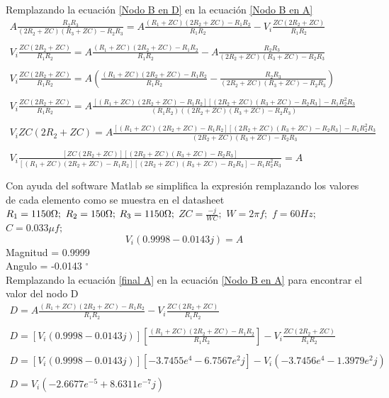     Remplazando la ecuación \ref{Nodo B en D} en la ecuación \ref{Nodo B en A}
    \begin{align*}
        A\frac{R_{2}R_{3}}{(2R_{2}+ZC)(R_{3}+ZC)-R_{2}R_{3}} = A\frac{(R_{1}+ZC)(2R_{2}+ZC) - R_{1}R_{2}}{R_{1}R_{2}} - V_{i}\frac{ZC(2R_{2}+ZC)}{R_{1}R_{2}}\\\\ 
        V_{i}\frac{ZC(2R_{2}+ZC)}{R_{1}R_{2}} = A\frac{(R_{1}+ZC)(2R_{2}+ZC) - R_{1}R_{2}}{R_{1}R_{2}} - A\frac{R_{2}R_{3}}{(2R_{2}+ZC)(R_{3}+ZC)-R_{2}R_{3}} \\\\ 
        V_{i}\frac{ZC(2R_{2}+ZC)}{R_{1}R_{2}} = A(\frac{(R_{1}+ZC)(2R_{2}+ZC) - R_{1}R_{2}}{R_{1}R_{2}} - \frac{R_{2}R_{3}}{(2R_{2}+ZC)(R_{3}+ZC)-R_{2}R_{3}}) \\\\ 
        V_{i}\frac{ZC(2R_{2}+ZC)}{R_{1}R_{2}} = A\frac{ [(R_{1}+ZC)(2R_{2}+ZC) - R_{1}R_{2}] [(2R_{2}+ZC)(R_{3}+ZC) - R_{2}R_{3}] - R_{1}R_{2}^{2}R_{3}}{(R_{1}R_{2})((2R_{2}+ZC)(R_{3}+ZC)-R_{2}R_{3})} \\\\ 
        V_{i}ZC(2R_{2}+ZC) = A\frac{ [(R_{1}+ZC)(2R_{2}+ZC) - R_{1}R_{2}] [(2R_{2}+ZC)(R_{3}+ZC)-R_{2}R_{3}] - R_{1}R_{2}^{2}R_{3} }{ (2R_{2}+ZC)(R_{3}+ZC)-R_{2}R_{3} } \\\\ 
        V_{i}\frac{ [ZC(2R_{2}+ZC)] [(2R_{2}+ZC)(R_{3}+ZC)-R_{2}R_{3}] }{ [(R_{1}+ZC)(2R_{2}+ZC) - R_{1}R_{2}] [(2R_{2}+ZC)(R_{3}+ZC)-R_{2}R_{3}]-R_{1}R_{2}^{2}R_{3} } = A\\\\ 
    \end{align*}
    Con ayuda del software Matlab se simplifica la expresión remplazando los valores de cada elemento como se muestra en el datasheet
    \\
    $ R_{1} = 1150 \ohm;$ $R_{2} = 150 \ohm;$ $R_{3} = 1150 \ohm;$ $ZC = \frac{-j}{WC};$
    $W = 2 \pi f;$ $f = 60 Hz;$ $C = 0.033\mu f ;$
    \begin{equation}\label{final A}
        V_{i}(0.9998 - 0.0143j)=A
    \end{equation}
    Magnitud = 0.9999 \\
    Angulo = -0.0143 $^{\circ}$ \\
    Remplazando la ecuación \ref{final A} en la ecuación \ref{Nodo B en A} para encontrar el valor del nodo D
    \begin{align*}
        D = A\frac{(R_{1}+ZC)(2R_{2}+ZC) - R_{1}R_{2}}{R_{1}R_{2}} - V_{i}\frac{ZC(2R_{2}+ZC)}{R_{1}R_{2}}\\\\
        D = [V_{i}(0.9998 - 0.0143j)] [\frac{(R_{1}+ZC)(2R_{2}+ZC) - R_{1}R_{2}}{R_{1}R_{2}}] - V_{i}\frac{ZC(2R_{2}+ZC)}{R_{1}R_{2}}\\\\
        D = [V_{i}(0.9998 - 0.0143j)] [-3.7455e^{4} - 6.7567e^{2}j] - V_{i}(-3.7456e^{4} - 1.3979e^{2}j)\\\\
        D = V_{i} (-2.6677e^{-5} + 8.6311e^{-7}j) \\\\
    \end{align*}
    
